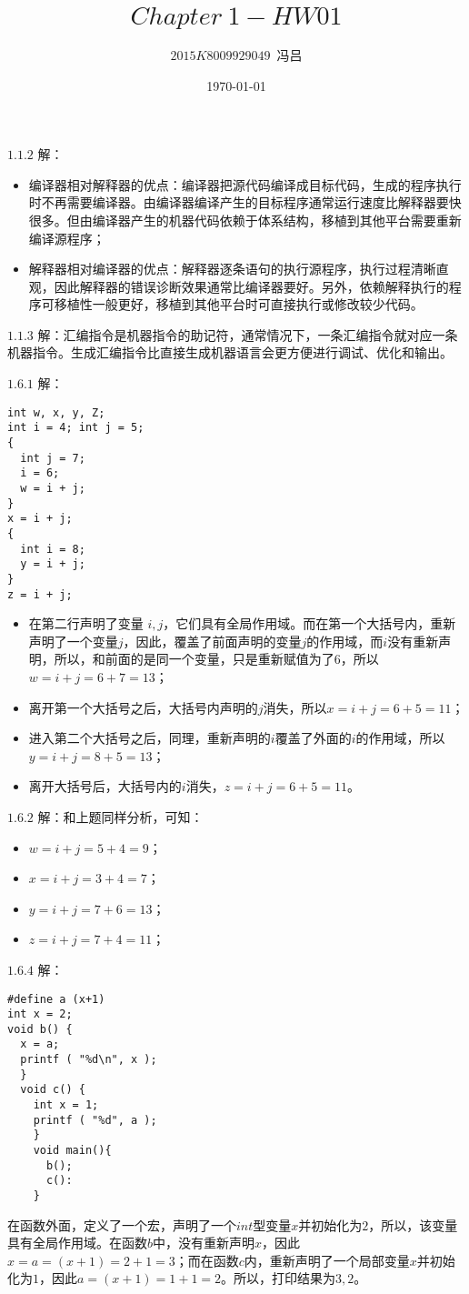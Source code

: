 \documentclass[UTF8,noindent]{ctexart}
\title{$Chapter\ 1-HW01$}
\author{$2015K8009929049$\ 冯吕}
\date{\today}
\begin{document}
\maketitle
{}
$1.1.2$ 解：
\begin{itemize}
  \item 编译器相对解释器的优点：编译器把源代码编译成目标代码，生成的程序执行时不再需要编译器。由编译器编译产生的目标程序通常运行速度比解释器要快很多。但由编译器产生的机器代码依赖于体系结构，移植到其他平台需要重新编译源程序；
	\item 解释器相对编译器的优点：解释器逐条语句的执行源程序，执行过程清晰直观，因此解释器的错误诊断效果通常比编译器要好。另外，依赖解释执行的程序可移植性一般更好，移植到其他平台时可直接执行或修改较少代码。
\end{itemize}

$1.1.3$ 解：汇编指令是机器指令的助记符，通常情况下，一条汇编指令就对应一条机器指令。生成汇编指令比直接生成机器语言会更方便进行调试、优化和输出。

$1.6.1$ 解：
\begin{lstlisting}
int w, x, y, Z;
int i = 4; int j = 5;
{
  int j = 7;
  i = 6;
  w = i + j;
}
x = i + j;
{
  int i = 8;
  y = i + j;
}
z = i + j;
\end{lstlisting}
\begin{itemize}
  \item 在第二行声明了变量 $i, j$，它们具有全局作用域。而在第一个大括号内，重新声明了一个变量$j$，因此，覆盖了前面声明的变量$j$的作用域，而$i$没有重新声明，所以，和前面的是同一个变量，只是重新赋值为了$6$，所以$w=i+j=6 + 7 = 13$；
  \item 离开第一个大括号之后，大括号内声明的$j$消失，所以$x = i +j = 6 + 5 = 11$；
  \item 进入第二个大括号之后，同理，重新声明的$i$覆盖了外面的$i$的作用域，所以$y = i + j = 8 + 5 = 13$；
  \item 离开大括号后，大括号内的$i$消失，$z = i + j = 6 + 5 = 11$。
\end{itemize}

$1.6.2$ 解：和上题同样分析，可知：
\begin{itemize}
  \item $w = i + j = 5 + 4 = 9$；
  \item $ x = i + j = 3 + 4 = 7$；
  \item $ y = i + j = 7 + 6 = 13$；
  \item $ z = i + j = 7 + 4 = 11$；
\end{itemize}

$1.6.4$ 解：
\begin{lstlisting}
#define a (x+1)
int x = 2;
void b() { 
  x = a;
  printf ( "%d\n", x ); 
  }
  void c() { 
	int x = 1; 
	printf ( "%d", a ); 
	}
	void main(){
	  b();
	  c():
	}
	\end{lstlisting}
	在函数外面，定义了一个宏，声明了一个$int$型变量$x$并初始化为$2$，所以，该变量具有全局作用域。在函数$b$中，没有重新声明$x$，因此$x = a = (x + 1) = 2 + 1= 3$；而在函数$c$内，重新声明了一个局部变量$x$并初始化为$1$，因此$a = (x + 1) = 1 + 1 = 2$。所以，打印结果为$3, 2$。
\end{document}
